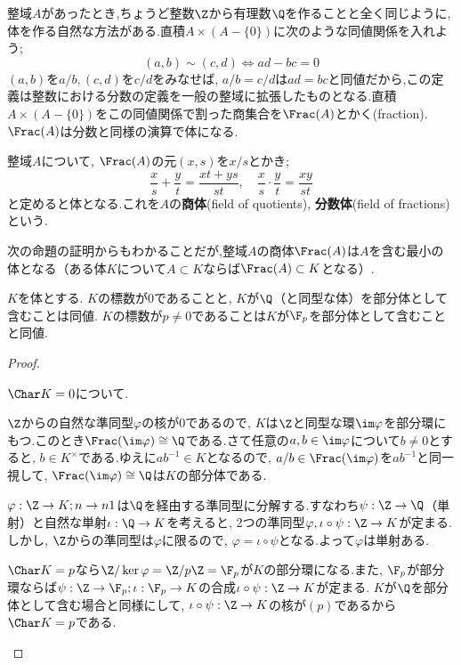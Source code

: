 整域$A$があったとき,ちょうど整数$\Z$から有理数$\Q$を作ることと全く同じように,体を作る自然な方法がある.直積$A\times(A-\{0\})$に次のような同値関係を入れよう;
\[(a,b)\sim(c,d)\Longleftrightarrow ad-bc=0\]
$(a,b)$を$a/b,(c,d)$を$c/d$をみなせば, $a/b=c/d$は$ad=bc$と同値だから,この定義は整数における分数の定義を一般の整域に拡張したものとなる.直積$A\times(A-\{0\})$をこの同値関係で割った商集合を$\Frac (A)$とかく(fraction). $\Frac (A)$は分数と同様の演算で体になる.

\begin{defi}[商体]
	整域$A$について, $\Frac (A)$の元$(x,s)$を$x/s$とかき;
	\[\frac{x}{s}+\frac{y}{t}=\frac{xt+ys}{st},\quad \frac{x}{s}\cdot\frac{y}{t}=\frac{xy}{st}\]
	と定めると体となる.これを$A$の\textbf{商体}(field of quotients), \textbf{分数体}(field of fractions)という.
\end{defi}

次の命題の証明からもわかることだが,整域$A$の商体$\Frac (A)$は$A$を含む最小の体となる（ある体$K$について$A\subset K$ならば$\Frac (A)\subset K$となる）.
\begin{prop}
	$K$を体とする. $K$の標数が0であることと, $K$が$\Q$（と同型な体）を部分体として含むことは同値. $K$の標数が$p\neq0$であることは$K$が$\F_p$を部分体として含むことと同値.
\end{prop}

\begin{proof}
	\begin{mrkw}
		\item $\Char K=0$について.
		
		\begin{eqv}
			\item $\Z$からの自然な準同型$\varphi$の核が$0$であるので, $K$は$\Z$と同型な環$\im\varphi$を部分環にもつ.このとき$\Frac(\im\varphi)\cong\Q$である.さて任意の$a,b\in\im\varphi$について$b\neq0$とすると, $b\in K^\times$である.ゆえに$ab^{-1}\in K$となるので, $a/b\in\Frac(\im\varphi)$を$ab^{-1}$と同一視して, $\Frac(\im\varphi)\cong\Q$は$K$の部分体である.
			
			\item $\varphi:\Z\to K;n\to n1$は$\Q$を経由する準同型に分解する.すなわち$\psi:\Z\to\Q$（単射）と自然な単射$\iota:\Q\to K$を考えると, 2つの準同型$\varphi,\iota\circ\psi:\Z\to K$が定まる.しかし, $\Z$からの準同型は$\varphi$に限るので, $\varphi=\iota\circ\psi$となる.よって$\varphi$は単射ある.
		\end{eqv}
	
		\item $\Char K=p$なら$\Z/\ker\varphi=\Z/p\Z=\F_p$が$K$の部分環になる.また, $\F_p$が部分環ならば$\psi:\Z\to\F_p;\iota:\F_p\to K$の合成$\iota\circ\psi:\Z\to K$が定まる. $K$が$\Q$を部分体として含む場合と同様にして, $\iota\circ\psi:\Z\to K$の核が$(p)$であるから$\Char K=p$である.
	\end{mrkw}
\end{proof}

